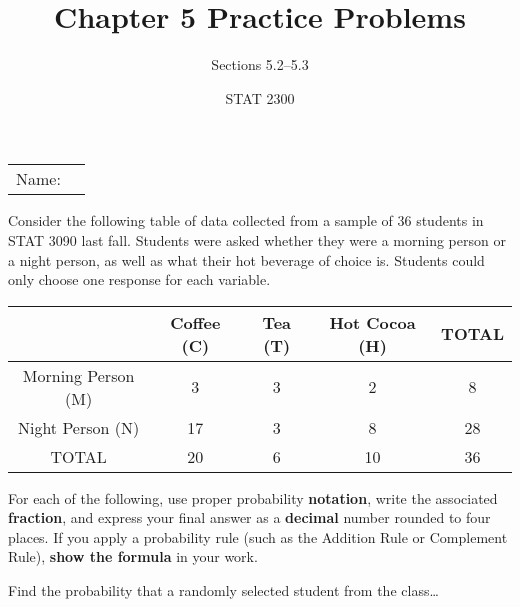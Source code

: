 \documentclass[noanswers]{exam}
\title{Chapter 5 Practice Problems}
\author{Sections 5.2--5.3}
\date{STAT 2300}
\begin{document}
\noindent\begin{tabular}{@{}p{.3in}p{3in}@{}}
Name: & \hrulefill
\end{tabular}

\vspace{3mm}

\begin{questions} 
	
	\vspace{3mm}
	
	\question Consider the following table of data collected from a sample of 36 students in STAT 3090 last fall. Students were asked whether they were a morning person or a night person, as well as what their hot beverage of choice is. Students could only choose one response for each variable.
	
	\begin{center}
\begin{tabular}{|c|c|c|c|c|}
\hline
 & \hspace{3mm} Coffee (C) \hspace{3mm} & \hspace{4mm} Tea (T) \hspace{4mm} & Hot Cocoa (H) & TOTAL\\
 \hline
 Morning Person (M) & 3 & 3 & 2 & 8 \\
 \hline
 Night Person (N) & 17 & 3 & 8 & 28 \\
\hline
TOTAL & 20 & 6 & 10 & 36 \\
\hline
\end{tabular}
\end{center}

For each of the following, use proper probability \textbf{notation}, write the associated \textbf{fraction}, and express your final answer as a \textbf{decimal} number rounded to four places. If you apply a probability rule (such as the Addition Rule or Complement Rule), \textbf{show the formula} in your work. 

\vspace{3mm}

Find the probability that a randomly selected student from the class\dots 

\end{questions}
\end{document}
